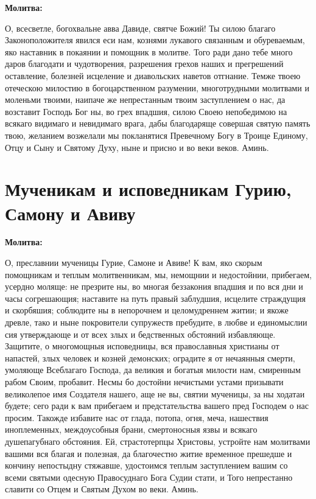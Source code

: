 \medskip


\bfseries Молитва:\normalfont{}\nopagebreak


О, всесветле, богохвальне авва Давиде, святче Божий! Ты силою благаго Законоположителя явился еси нам, кознями лукавого связанным и обуреваемым, яко наставник в покаянии и помощник в молитве. Того ради дано тебе много даров благодати и чудотворения, разрешения грехов наших и прегрешений оставление, болезней исцеление и диавольских наветов отгнание. Темже твоею отеческою милостию в богоцарственном разумении, многотрудными молитвами и моленьми твоими, наипаче же непрестанным твоим заступлением о нас, да возставит Господь Бог ны, во грех впадшия, силою Своею непобедимою на всякаго видимаго и невидимаго врага, дабы благодаряще совершая святую память твою, желанием возжелали мы покланятися Превечному Богу в Троице Единому, Отцу и Сыну и Святому Духу, ныне и присно и во веки веков. Аминь.
\mychapterending


 

\section{Мученикам и исповедникам Гурию, Самону и Авиву}
 


\bfseries Молитва:\normalfont{}\nopagebreak


О, преславнии мученицы Гурие, Самоне и Авиве! К вам, яко скорым помощникам и теплым молитвенникам, мы, немощнии и недостойнии, прибегаем, усердно моляще: не презрите ны, во многая беззакония впадшия и по вся дни и часы согрешающия; наставите на путь правый заблудшия, исцелите страждущия и скорбяшия; соблюдите ны в непорочнем и целомудреннем житии; и якоже древле, тако и ныне покровители супружеств пребудите, в любве и единомыслии сия утверждающе и от всех злых и бедственных обстояний избавляюще. Защитите, о многомощныя исповедницы, вся православныя христианы от напастей, злых человек и козней демонских; оградите я от нечаянныя смерти, умоляюще Всеблагаго Господа, да великия и богатыя милости нам, смиренным рабом Своим, пробавит. Несмы бо достойни нечистыми устами призывати великолепое имя Создателя нашего, аще не вы, святии мученицы, за ны ходатаи будете; сего ради к вам прибегаем и предстательства вашего пред Господем о нас просим. Такожде избавите нас от глада, потопа, огня, меча, нашествия иноплеменных, междоусобныя брани, смертоносныя язвы и всякаго душепагубнаго обстояния. Ей, страстотерпцы Христовы, устройте нам молитвами вашими вся благая и полезная, да благочестно житие временное прешедше и кончину непостыдну стяжавше, удостоимся теплым заступлением вашим со всеми святыми одесную Правосуднаго Бога Судии стати, и Того непрестанно славити со Отцем и Святым Духом во веки. Аминь.
\mychapterending

